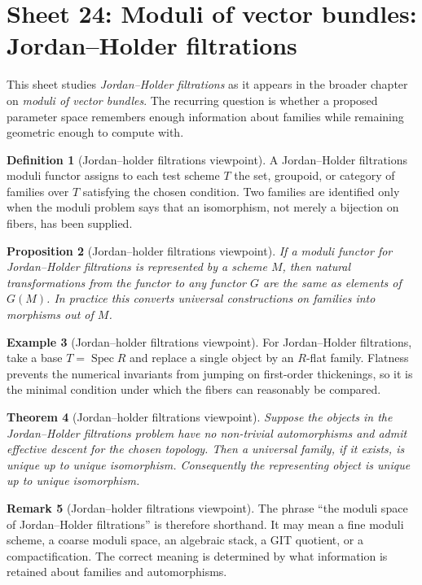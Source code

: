 \documentclass[11pt]{amsart}
\newtheorem{theorem}{Theorem}[section]
\newtheorem{proposition}[theorem]{Proposition}
\theoremstyle{definition}
\newtheorem{definition}[theorem]{Definition}
\newtheorem{example}[theorem]{Example}
\newtheorem{remark}[theorem]{Remark}
\newcommand{\Spec}{\operatorname{Spec}}
\begin{document}
\section{Sheet 24: Moduli of vector bundles: Jordan--Holder filtrations}
This sheet studies \emph{Jordan--Holder filtrations} as it appears in the broader chapter on \emph{moduli of vector bundles}.  The recurring question is whether a proposed parameter space remembers enough information about families while remaining geometric enough to compute with.
\begin{definition}[Jordan--holder filtrations viewpoint]
A Jordan--Holder filtrations moduli functor assigns to each test scheme $T$ the set, groupoid, or category of families over $T$ satisfying the chosen condition.  Two families are identified only when the moduli problem says that an isomorphism, not merely a bijection on fibers, has been supplied.
\end{definition}
\begin{proposition}[Jordan--holder filtrations viewpoint]
If a moduli functor for Jordan--Holder filtrations is represented by a scheme $M$, then natural transformations from the functor to any functor $G$ are the same as elements of $G(M)$.  In practice this converts universal constructions on families into morphisms out of $M$.
\end{proposition}
\begin{example}[Jordan--holder filtrations viewpoint]
For Jordan--Holder filtrations, take a base $T=\Spec R$ and replace a single object by an $R$-flat family.  Flatness prevents the numerical invariants from jumping on first-order thickenings, so it is the minimal condition under which the fibers can reasonably be compared.
\end{example}
\begin{theorem}[Jordan--holder filtrations viewpoint]
Suppose the objects in the Jordan--Holder filtrations problem have no non-trivial automorphisms and admit effective descent for the chosen topology.  Then a universal family, if it exists, is unique up to unique isomorphism.  Consequently the representing object is unique up to unique isomorphism.
\end{theorem}
\begin{remark}[Jordan--holder filtrations viewpoint]
The phrase ``the moduli space of Jordan--Holder filtrations'' is therefore shorthand.  It may mean a fine moduli scheme, a coarse moduli space, an algebraic stack, a GIT quotient, or a compactification.  The correct meaning is determined by what information is retained about families and automorphisms.
\end{remark}
\end{document}
